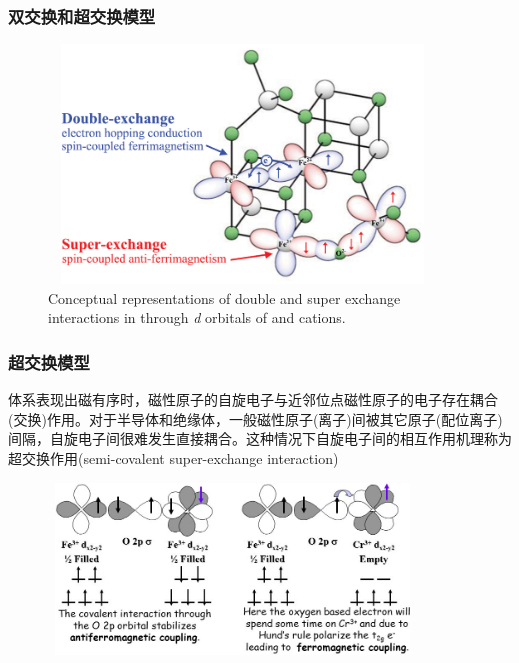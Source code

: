 {\frame
{
	\frametitle{双交换和超交换模型}
\begin{figure}[h!]
	\vspace{-0.35in}
\centering
\includegraphics[height=2.50in,width=4.05in,viewport=0 0 205 140,clip]{Figures/Conceptual-representations-of-double-and-super-exchange-interactions-in-Fe3O4-through-d.png}
\caption{\tiny \textrm{Conceptual representations of double and super exchange interactions in  through \textit{d} orbitals of  and  cations.}}%
\label{double-super-exchange-1}
\end{figure}
}

\frame
{
	\frametitle{超交换模型}
	体系表现出磁有序时，磁性原子的自旋电子与近邻位点磁性原子的电子存在耦合(交换)作用。对于半导体和绝缘体，一般磁性原子(离子)间被其它原子(配位离子)间隔，自旋电子间很难发生直接耦合。这种情况下自旋电子间的相互作用机理称为超交换作用\textrm{(semi-covalent super-exchange interaction)}
\begin{figure}[h!]
	\vspace{-3.5pt}
\centering
\includegraphics[height=1.80in,width=3.85in,viewport=0 0 660 320,clip]{Figures/Super-exchange-model.jpg}
\label{super-exchange-O}
\end{figure}
}

}
